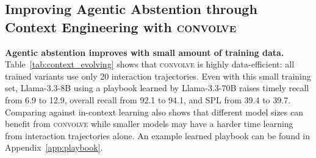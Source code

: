 \documentclass{article}
\newcommand{\method}{\textsc{convolve}\xspace}
\begin{document}
\vspace{-2mm}
\subsection{Improving Agentic Abstention through Context Engineering with \method}

\vspace{-1mm}
\textbf{Agentic abstention improves with small amount of training data.} Table~\ref{tab:context_evolving} shows that \method is highly data-efficient: all trained variants use only 20 interaction trajectories. Even with this small training set, Llama-3.3-8B using a playbook learned by Llama-3.3-70B raises timely recall from 6.9 to 12.9, overall recall from 92.1 to 94.1, and SPL from 39.4 to 39.7. 
Comparing against in-context learning also shows that different model sizes can benefit from \method while smaller models may have a harder time learning from interaction trajectories alone.
An example learned playbook can be found in Appendix~\ref{app:playbook}.




\end{document}

